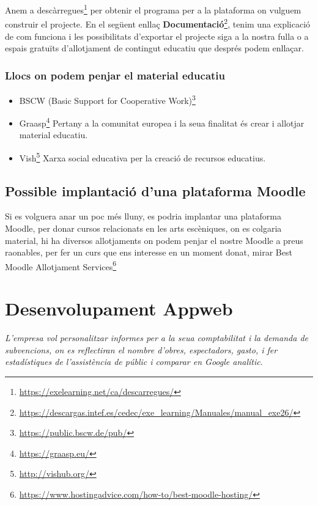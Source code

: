 \documentclass[
  10pt,
]{krantz}
\DeclareRobustCommand{\href}[2]{#2\footnote{\url{#1}}}
\providecommand{\tightlist}{%
  \setlength{\itemsep}{0pt}\setlength{\parskip}{0pt}}
\begin{document}
Anem a \href{https://exelearning.net/ca/descarregues/}{descàrregues} per obtenir el programa per a la plataforma on vulguem construir el projecte. En el següent enllaç \href{https://descargas.intef.es/cedec/exe_learning/Manuales/manual_exe26/}{\textbf{Documentació}}, tenim una explicació de com funciona i les possibilitats d'exportar el projecte siga a la nostra fulla o a espais gratuïts d'allotjament de contingut educatiu que després podem enllaçar.

\hypertarget{llocs-on-podem-penjar-el-material-educatiu}{%
\subsection{Llocs on podem penjar el material educatiu}\label{llocs-on-podem-penjar-el-material-educatiu}}

\begin{itemize}
\tightlist
\item
  \href{https://public.bscw.de/pub/}{BSCW (Basic Support for Cooperative Work)}
\item
  \href{https://graasp.eu/}{Graasp} Pertany a la comunitat europea i la seua finalitat és crear i allotjar material educatiu.
\item
  \href{http://vishub.org/}{Vish} Xarxa social educativa per la creació de recursos educatius.
\end{itemize}

\hypertarget{possible-implantaciuxf3-duna-plataforma-moodle}{%
\section{Possible implantació d'una plataforma Moodle}\label{possible-implantaciuxf3-duna-plataforma-moodle}}

Si es volguera anar un poc més lluny, es podria implantar una plataforma Moodle, per donar cursos relacionats en les arts escèniques, on es colgaria material, hi ha diversos allotjaments on podem penjar el nostre Moodle a preus raonables, per fer un curs que ens interesse en un moment donat, mirar \href{https://www.hostingadvice.com/how-to/best-moodle-hosting/}{Best Moodle Allotjament Services}

\hypertarget{desenvolupament-appweb}{%
\chapter{Desenvolupament Appweb}\label{desenvolupament-appweb}}

\emph{L'empresa vol personalitzar informes per a la seua comptabilitat i la demanda de subvencions, on es reflectiran el nombre d'obres, espectadors, gasto, i fer estadístiques de l'assistència de públic i comparar en Google analític}.
\end{document}
